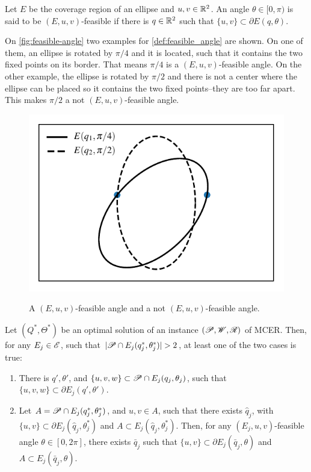 \begin{definicao}\label{def:feasible_angle}
	Let $E$ be the coverage region of an ellipse and $u, v \in \mathbb{R}^2$. An angle $\theta \in [0, \pi)$ is said to be $(E, u, v)$-feasible if there is $q \in \mathbb{R}^2$ such that $\{u, v\} \subset \partial E(q, \theta)$.
\end{definicao}

On \autoref{fig:feasible-angle} two examples for \autoref{def:feasible_angle} are shown. On one of them, an ellipse is rotated by $\pi/4$ and it is located, such that it contains the two fixed points on its border. That means $\pi/4$ is a $(E, u, v)$-feasible angle. On the other example, the ellipse is rotated by $\pi/2$ and there is not a center where the ellipse can be placed so it contains the two fixed points--they are too far apart. This makes $\pi/2$ a not $(E, u, v)$-feasible angle.

\begin{figure}
	\centering
	\caption{A $(E, u, v)$-feasible angle and a not $(E, u, v)$-feasible angle.}
	\includegraphics{tex/figures/scripts/feasible-angle}
	\fautor
	\label{fig:feasible-angle}
\end{figure}

\begin{lema}\label{lema:3pnts}
Let $(Q^*, \Theta^*)$ be an optimal solution of an instance $(\mathscr{P}, \mathscr{W}, \mathscr{R})$ of MCER. Then, for any $E_j \in \mathscr{E}$, such that $|\Pp \cap E_j(q_j^*, \theta_j^*)|>2$, at least one of the two cases is true:
	
	\begin{enumerate}[label=(\alph*)]
		\item There is $q', \theta'$, and $\{u, v, w\} \subset \mathscr{P} \cap E_j(q_j, \theta_j)$, such that $\{u, v, w\} \subset \partial E_j(q', \theta')$.
		
		\item Let $A=\mathscr{P} \cap E_j(q_j^*, \theta_j^*)$, and $u, v \in A$, such that there exists $\hat{q}_j$, with $\{u, v\} \subset \partial E_j(\hat{q}_j, \theta_j^*)$ and $A \subset E_j(\hat{q}_j, \theta_j^*)$. Then, for any $(E_j, u, v)$-feasible angle $\theta \in [0, 2\pi]$, there exists $\bar{q}_j$ such that $\{u, v\} \subset \partial E_j(\bar{q}_j, \theta)$ and $A \subset E_j(\bar{q}_j, \theta)$.
	\end{enumerate}
\end{lema}

